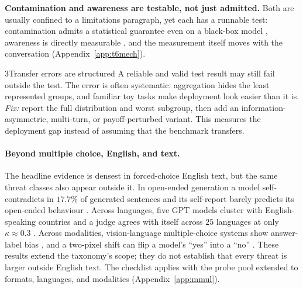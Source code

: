 \documentclass[11pt]{article}
\begin{document}
\textbf{Contamination and awareness are testable, not just admitted.} Both are
usually confined to a limitations paragraph, yet each has a runnable test:
contamination admits a statistical guarantee even on a black-box model
\cite{oren2024proving,dekoninck2024constat,zhang2024pacost}, awareness is
directly measurable
\cite{needham2025evalaware,laine2024sad,vanderweij2025sandbagging}, and the
measurement itself moves with the conversation
\cite{sharma2024sycophancy,kim2025rebuttal} (Appendix~\ref{app:t6mech}).

\begin{takeaway}{3}{Transfer errors are structured}
A reliable and valid test result may still fail outside the test. The error is
often systematic: aggregation hides the least represented groups, and familiar
toy tasks make deployment look easier than it is. \emph{Fix:} report the full
distribution and worst subgroup, then add an information-asymmetric, multi-turn,
or payoff-perturbed variant. This measures the deployment gap instead of
assuming that the benchmark transfers.
\end{takeaway}

\paragraph{Beyond multiple choice, English, and text.}
\label{sec:mmul}
The headline evidence is densest in forced-choice English text, but the same
threat classes also appear outside it. In open-ended
generation a model self-contradicts in $17.7\%$ of generated sentences
\cite{mundler2024selfcontradictory} and its self-report barely predicts its
open-ended behaviour \cite{song2025psychometric}. Across languages, five GPT
models cluster with English-speaking countries and a judge agrees with itself
across $25$ languages at only $\kappa\approx0.3$
\cite{tao2024cultural,fu2025reliable}. Across modalities, vision-language
multiple-choice systems show answer-label bias \cite{atabuzzaman2025mcqa}, and
a two-pixel shift can flip a model's ``yes'' into a ``no''
\cite{rosenfeld2025questioning}. These results extend the
taxonomy's scope; they do not establish that every threat is larger outside
English text. The checklist applies with the
probe pool extended to formats, languages, and modalities
(Appendix~\ref{app:mmul}).
\end{document}

